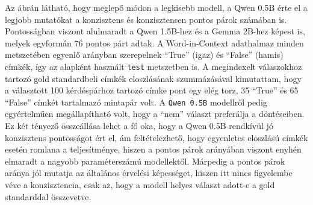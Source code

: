 \documentclass{article}
\begin{document}
Az ábrán látható, hogy meglepő módon a legkisebb modell, a Qwen 0.5B érte el a legjobb mutatókat a konzisztens és konzisztensen pontos párok számában is. Pontosságban viszont alulmaradt a Qwen 1.5B-hez és a Gemma 2B-hez képest is, melyek egyformán 76 pontos párt adtak.
A Word-in-Context adathalmaz minden metszetében egyenlő arányban szerepelnek ``True'' (igaz) és ``False'' (hamis) címkék, így az alapként használt \texttt{test} metszetben is. A megindexelt válaszokhoz tartozó gold standardbeli címkék eloszlásának szummázásával kimutattam, hogy a választott 100 kérdéspárhoz tartozó címke pont egy elég torz, 35 ``True'' és 65 ``False'' címkét tartalmazó mintapár volt. A \texttt{\allowbreak Qwen 0.5B} modellről pedig egyértelműen megállapítható volt, hogy a ``nem'' választ preferálja a döntéseiben. 
Ez két tényező összeállása lehet a fő oka, hogy a Qwen 0.5B rendkívül jó konzisztens pontosságot ért el, ám feltételezhető, hogy egyenletes eloszlású címkék esetén romlana a teljesítménye, hiszen a pontos párok arányában viszont enyhén elmaradt a nagyobb paraméterszámú modellektől.
Márpedig a pontos párok aránya jól mutatja az általános érvelési képességet, hiszen itt nincs figyelembe véve a konzisztencia, csak az, hogy a modell helyes választ adott-e a gold standarddal összevetve.
 
\end{document}
